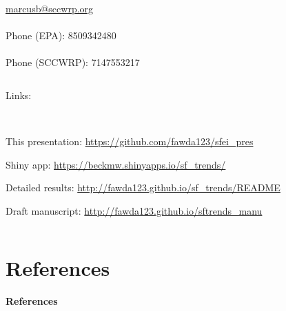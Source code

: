 \documentclass[serif]{beamer}\usepackage[]{graphicx}\usepackage[]{color}
\begin{document}
\begin{frame}
\begin{columns}
\begin{column}{0.3\textwidth}
\begin{center}
\href{mailto:marcusb@sccwrp.org}{marcusb@sccwrp.org} \\~\\
Phone (EPA): 8509342480 \\~\\
Phone (SCCWRP): 7147553217
\end{center}
\end{column}
\end{columns}
\vfill
Links:\\~\\
\begin{columns}
\begin{column}{0.9\textwidth}
\scriptsize
This presentation: \href{https://github.com/fawda123/sfei_pres}{\url{https://github.com/fawda123/sfei\_pres}}

Shiny app: \href{https://beckmw.shinyapps.io/sf_trends/}{\url{https://beckmw.shinyapps.io/sf_trends/}}

Detailed results: \href{http://fawda123.github.io/sf_trends/README}{\url{http://fawda123.github.io/sf\_trends/README}}

Draft manuscript: \href{http://fawda123.github.io/sftrends_manu}{\url{http://fawda123.github.io/sftrends\_manu}}
\end{column}
\end{columns}
\end{frame}

\section{References}
\begin{frame}[t]{\textbf{References}}
\tiny
{}


\end{frame}
\end{document}
